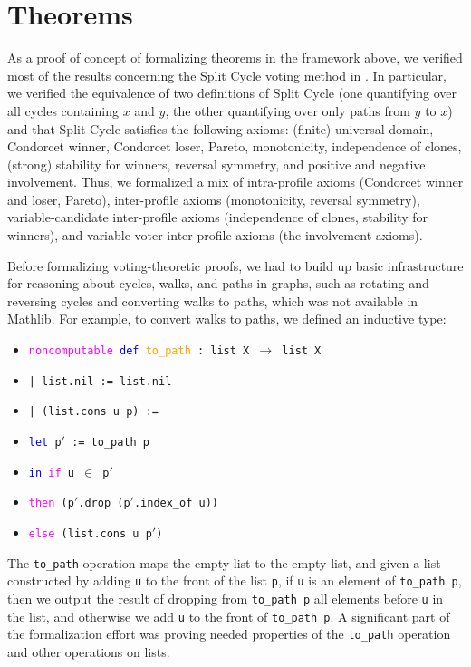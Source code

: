 \documentclass[runningheads]{llncs}
\begin{document}
\section{Theorems}\label{Theorems}

As a proof of concept of formalizing theorems in the framework above, we verified most of the results concerning the Split Cycle voting method in \cite{HP2020}. In particular, we verified the equivalence of two definitions of Split Cycle (one quantifying over all cycles containing $x$ and $y$, the other quantifying over only paths from $y$ to $x$) and that Split Cycle satisfies the following axioms: (finite) universal domain, Condorcet winner, Condorcet loser, Pareto, monotonicity, independence of clones, (strong) stability for winners, reversal symmetry, and positive and negative involvement. Thus, we formalized a mix of intra-profile axioms (Condorcet winner and loser, Pareto), inter-profile axioms (monotonicity, reversal symmetry), variable-candidate inter-profile axioms (independence of clones, stability for winners), and variable-voter inter-profile axioms (the involvement axioms). 



Before formalizing voting-theoretic proofs, we had to build up basic infrastructure for reasoning about cycles, walks, and paths in graphs, such as rotating and reversing cycles and converting walks to paths, which was not available in Mathlib. For example, to convert walks to paths, we defined an inductive type:
\begin{itemize}
\item[] \texttt{\textcolor{magenta}{noncomputable} \textcolor{blue}{def} \textcolor{orange}{to\_path} : list X $\to$ list X}
\item[] \texttt{| list.nil := list.nil}
\item[] \texttt{| (list.cons u p) :=}
\item[]    \quad\texttt{\textcolor{blue}{let} p$'$ := to\_path p}
\item[]    \quad\texttt{\textcolor{blue}{in} \textcolor{magenta}{if} u $\in$ p$'$}
 \item[]     \qquad  \texttt{\textcolor{magenta}{then} (p$'$.drop (p$'$.index\_of u))}
 \item[]       \qquad \texttt{\textcolor{magenta}{else} (list.cons u p$'$)}
 \end{itemize}
The \texttt{to\_path} operation maps the empty list to the empty list, and given a list constructed by adding \texttt{u} to the front of the list \texttt{p},  if \texttt{u} is an element of \texttt{to\_path~p}, then we output the result of dropping from \texttt{to\_path p} all elements before \texttt{u} in the list, and otherwise we add \texttt{u} to the front of \texttt{to\_path p}. A significant part of the formalization effort was proving needed properties of the \texttt{to\_path} operation and other operations on lists.
\end{document}

